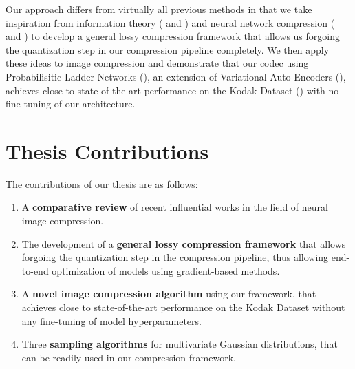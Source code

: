 \par
Our approach differs from virtually all previous methods in that we take
inspiration from information theory (\cite{rissanen1986stochastic} and
\cite{harsha2007communication}) and neural network compression
(\cite{hinton1993keeping} and \cite{havasi2018minimal}) to develop a general
lossy compression
framework that allows us forgoing the quantization step in our compression
pipeline completely. We then apply these ideas to image compression and
demonstrate that our codec using Probabilisitic Ladder Networks 
(\cite{sonderby2016train}), an extension of Variational Auto-Encoders
(\cite{kingma2013auto}), achieves close to state-of-the-art performance on the
Kodak Dataset (\cite{kodakdataset}) with no fine-tuning of our architecture.

\section{Thesis Contributions}
\par
The contributions of our thesis are as follows:
\begin{enumerate}
\item A \textbf{comparative review} of recent influential works in the field of
  neural image compression.

\item The development of a \textbf{general lossy compression
    framework} that allows forgoing the quantization step in the compression pipeline,
  thus allowing end-to-end optimization of models using gradient-based methods.

\item A \textbf{novel image compression algorithm} using our framework, that 
  achieves close to state-of-the-art performance on the Kodak Dataset
  \cite{kodakdataset} without any fine-tuning of model hyperparameters.

\item Three \textbf{sampling algorithms} for multivariate Gaussian
  distributions, that can be readily used in our compression framework.
\end{enumerate}

